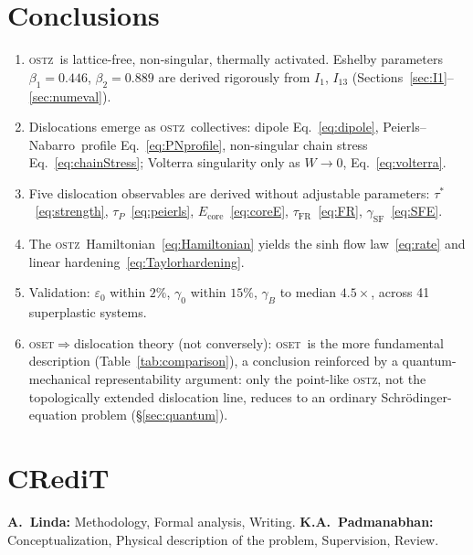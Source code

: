 \documentclass[3p]{elsarticle}
\newcommand{\OSTZ}{\textsc{ostz}}
\newcommand{\OSET}{\textsc{oset}}
\newcommand{\gz}{\gamma_0}
\newcommand{\PN}{Peierls--Nabarro}
\begin{document}
\section{Conclusions}
\label{sec:conclusions}

\begin{enumerate}

\item \OSTZ\ is lattice-free, non-singular, thermally activated.
  Eshelby parameters $\beta_1=0.446$, $\beta_2=0.889$ are derived
  rigorously from $I_1$, $I_{13}$
  (Sections~\ref{sec:I1}--\ref{sec:numeval}).

\item Dislocations emerge as \OSTZ\ collectives:
  dipole Eq.~\eqref{eq:dipole}, \PN\ profile Eq.~\eqref{eq:PNprofile},
  non-singular chain stress Eq.~\eqref{eq:chainStress}; Volterra
  singularity only as $W\to0$, Eq.~\eqref{eq:volterra}.

\item Five dislocation observables are derived without adjustable
  parameters: $\tau^*$~\eqref{eq:strength}, $\tau_P$~\eqref{eq:peierls},
  $E_\text{core}$~\eqref{eq:coreE}, $\tau_\text{FR}$~\eqref{eq:FR},
  $\gamma_\text{SF}$~\eqref{eq:SFE}.

\item The \OSTZ\ Hamiltonian~\eqref{eq:Hamiltonian} yields the sinh
  flow law~\eqref{eq:rate} and linear
  hardening~\eqref{eq:Taylorhardening}.

\item Validation: $\varepsilon_0$ within $2\%$, $\gz$ within $15\%$,
  $\gamma_B$ to median $4.5\times$, across 41 superplastic systems.

\item \OSET$\Rightarrow$dislocation theory (not conversely):
  \OSET\ is the more fundamental description
  (Table~\ref{tab:comparison}), a conclusion reinforced by a
  quantum-mechanical representability argument: only the point-like
  \OSTZ, not the topologically extended dislocation line, reduces to
  an ordinary Schr\"odinger-equation problem (\S\ref{sec:quantum}).

\end{enumerate}

\section*{CRediT}
\textbf{A.~Linda:} Methodology, Formal analysis, Writing.
\textbf{K.A.~Padmanabhan:} Conceptualization, Physical description of
the problem, Supervision, Review.
\end{document}
